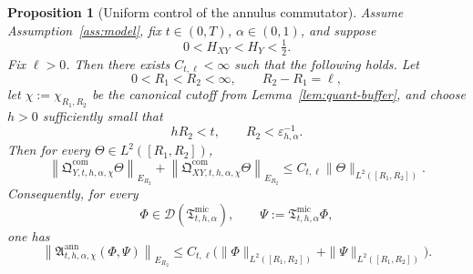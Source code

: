 \documentclass[11pt,a4paper]{amsart}
\theoremstyle{plain}
\newtheorem{proposition}[theorem]{Proposition}
\theoremstyle{definition}
\theoremstyle{remark}
\begin{document}
\begin{proposition}[Uniform control of the annulus commutator]
\label{prop:annulus-control}
Assume Assumption~\ref{ass:model}, fix \(t\in(0,T)\), \(\alpha\in(0,1)\), and suppose
\[
0<H_{XY}<H_Y<\tfrac12.
\]
Fix \(\ell>0\). Then there exists \(C_{t,\ell}<\infty\) such that the following holds. Let
\[
0<R_1<R_2<\infty,
\qquad
R_2-R_1=\ell,
\]
let \(\chi:=\chi_{R_1,R_2}\) be the canonical cutoff from Lemma~\ref{lem:quant-buffer}, and choose
\(h>0\) sufficiently small that
\[
hR_2<t,
\qquad
R_2<\varepsilon_{h,\alpha}^{-1}.
\]
Then for every \(\Theta\in L^2([R_1,R_2])\),
\begin{equation}\label{eq:annulus-control-single}
\left\|
\mathfrak Q_{Y,t,h,\alpha,\chi}^{\mathrm{com}}\Theta
\right\|_{E_{R_2}}
+
\left\|
\mathfrak Q_{XY,t,h,\alpha,\chi}^{\mathrm{com}}\Theta
\right\|_{E_{R_2}}
\le
C_{t,\ell}\|\Theta\|_{L^2([R_1,R_2])}.
\end{equation}
Consequently, for every
\[
\Phi\in\mathcal D(\mathfrak T_{t,h,\alpha}^{\mathrm{mic}}),
\qquad
\Psi:=\mathfrak T_{t,h,\alpha}^{\mathrm{mic}}\Phi,
\]
one has
\begin{equation}\label{eq:annulus-control-pair}
\left\|
\mathfrak A_{t,h,\alpha,\chi}^{\mathrm{ann}}(\Phi,\Psi)
\right\|_{E_{R_2}}
\le
C_{t,\ell}
\bigl(
\|\Phi\|_{L^2([R_1,R_2])}
+
\|\Psi\|_{L^2([R_1,R_2])}
\bigr).
\end{equation}
\end{proposition}
\end{document}
